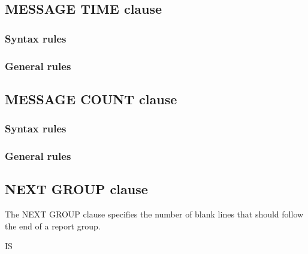 \subsection{MESSAGE TIME clause}

\begin{syntax}[\deletedcolour]
\end{syntax}

\subsubsection{Syntax rules}

\subsubsection{General rules}

\subsection{MESSAGE COUNT clause}

\begin{syntax}[\deletedcolour]
\end{syntax}

\subsubsection{Syntax rules}

\subsubsection{General rules}

\subsection{NEXT GROUP clause}

The NEXT GROUP clause specifies the number of blank lines that should follow the end of a report group.

\begin{syntax}
    IS
  \begin{1=}
    \begin{0-1}
    \end{0-1}
    \integer \\
     
  \end{1=}
\end{syntax}

